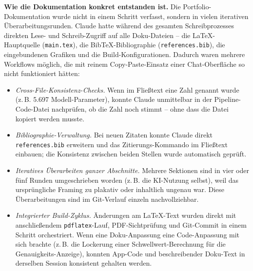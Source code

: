 \documentclass[12pt, a4paper, ngerman]{article}
\newcommand{\code}[1]{\texttt{#1}}
\begin{document}
\textbf{Wie die Dokumentation konkret entstanden ist.}
Die Portfolio-Dokumentation wurde nicht in einem Schritt verfasst,
sondern in vielen iterativen Überarbeitungsrunden. Claude hatte
während des gesamten Schreibprozesses direkten Lese- und
Schreib-Zugriff auf alle Doku-Dateien -- die LaTeX-Hauptquelle
(\code{main.tex}), die BibTeX-Bibliographie
(\code{references.bib}), die eingebundenen Grafiken und die
Build-Konfigurationen. Dadurch waren mehrere Workflows möglich,
die mit reinem Copy-Paste-Einsatz einer Chat-Oberfläche so nicht
funktioniert hätten:

\begin{itemize}
\item \emph{Cross-File-Konsistenz-Checks.} Wenn im Fließtext eine
  Zahl genannt wurde (z.\,B. \glqq{}5.697 Modell-Parameter\grqq{}),
  konnte Claude unmittelbar in der Pipeline-Code-Datei nachprüfen,
  ob die Zahl noch stimmt -- ohne dass die Datei kopiert werden
  musste.
\item \emph{Bibliographie-Verwaltung.} Bei neuen Zitaten konnte
  Claude direkt \code{references.bib} erweitern und das
  Zitierungs-Kommando im Fließtext einbauen; die Konsistenz
  zwischen beiden Stellen wurde automatisch geprüft.
\item \emph{Iteratives Überarbeiten ganzer Abschnitte.} Mehrere
  Sektionen sind in vier oder fünf Runden umgeschrieben worden
  (z.\,B. die KI-Nutzung selbst), weil das ursprüngliche
  Framing zu plakativ oder inhaltlich ungenau war. Diese
  Überarbeitungen sind im Git-Verlauf einzeln nachvollziehbar.
\item \emph{Integrierter Build-Zyklus.} Änderungen am LaTeX-Text
  wurden direkt mit anschließendem \code{pdflatex}-Lauf,
  PDF-Sichtprüfung und Git-Commit in einem Schritt orchestriert.
  Wenn eine Doku-Anpassung eine Code-Anpassung mit sich brachte
  (z.\,B. die Lockerung einer Schwellwert-Berechnung für die
  Genauigkeits-Anzeige), konnten App-Code und beschreibender
  Doku-Text in derselben Session konsistent gehalten werden.
\end{itemize}
\end{document}
